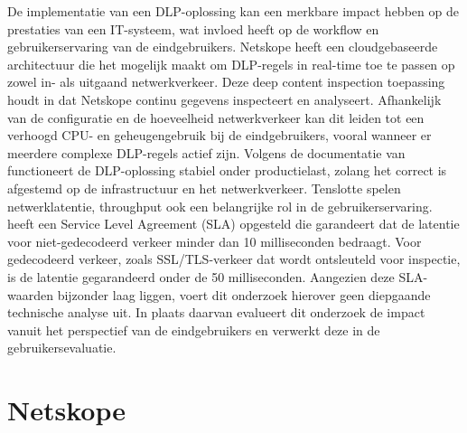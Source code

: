 De implementatie van een DLP-oplossing kan een merkbare impact hebben op de prestaties van een IT-systeem,
wat invloed heeft op de workflow en gebruikerservaring van de eindgebruikers. 
Netskope heeft een cloudgebaseerde architectuur die het mogelijk maakt om DLP-regels in real-time toe te passen op zowel in- als uitgaand netwerkverkeer.
Deze deep content inspection toepassing houdt in dat Netskope continu gegevens inspecteert en analyseert. 
Afhankelijk van de configuratie en de hoeveelheid netwerkverkeer kan dit leiden tot een verhoogd CPU- en geheugengebruik bij de eindgebruikers,
vooral wanneer er meerdere complexe DLP-regels actief zijn.
Volgens de documentatie van \textcite{Netskope2025Utilization} functioneert de DLP-oplossing stabiel onder productielast, 
zolang het correct is afgestemd op de infrastructuur en het netwerkverkeer.
Tenslotte spelen netwerklatentie, throughput ook een belangrijke rol in de gebruikerservaring.
\textcite{Netskope2021SLA} heeft een Service Level Agreement (SLA) opgesteld die garandeert dat de latentie voor niet-gedecodeerd verkeer minder dan 10 milliseconden bedraagt.
Voor gedecodeerd verkeer, zoals SSL/TLS-verkeer dat wordt ontsleuteld voor inspectie, is de latentie gegarandeerd onder de 50 milliseconden.
Aangezien deze SLA-waarden bijzonder laag liggen, voert dit onderzoek hierover geen diepgaande technische analyse uit.
In plaats daarvan evalueert dit onderzoek de impact vanuit het perspectief van de eindgebruikers en verwerkt deze in de gebruikersevaluatie.


\section{Netskope}%
\label{sec:netskope-literatuurstudie}

